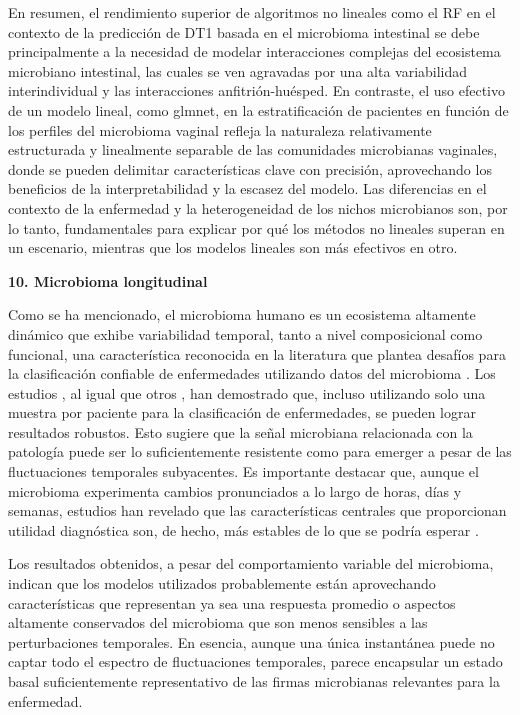 En resumen, el rendimiento superior de algoritmos no lineales como el RF en el contexto de la predicción de DT1 basada en el microbioma intestinal \cite{paper2} se debe principalmente a la necesidad de modelar interacciones complejas del ecosistema microbiano intestinal, las cuales se ven agravadas por una alta variabilidad interindividual y las interacciones anfitrión-huésped. En contraste, el uso efectivo de un modelo lineal, como glmnet, en la estratificación de pacientes en función de los perfiles del microbioma vaginal \cite{paper3} refleja la naturaleza relativamente estructurada y linealmente separable de las comunidades microbianas vaginales, donde se pueden delimitar características clave con precisión, aprovechando los beneficios de la interpretabilidad y la escasez del modelo. Las diferencias en el contexto de la enfermedad y la heterogeneidad de los nichos microbianos son, por lo tanto, fundamentales para explicar por qué los métodos no lineales superan en un escenario, mientras que los modelos lineales son más efectivos en otro.

\textbf{10. Microbioma longitudinal}

Como se ha mencionado, el microbioma humano es un ecosistema altamente dinámico que exhibe variabilidad temporal, tanto a nivel composicional como funcional, una característica reconocida en la literatura que plantea desafíos para la clasificación confiable de enfermedades utilizando datos del microbioma \cite{aldars2021systematic}. Los estudios \cite{paper2, paper3}, al igual que otros \cite{eck2017robust}, han demostrado que, incluso utilizando solo una muestra por paciente para la clasificación de enfermedades, se pueden lograr resultados robustos. Esto sugiere que la señal microbiana relacionada con la patología puede ser lo suficientemente resistente como para emerger a pesar de las fluctuaciones temporales subyacentes. Es importante destacar que, aunque el microbioma experimenta cambios pronunciados a lo largo de horas, días y semanas, estudios han revelado que las características centrales que proporcionan utilidad diagnóstica son, de hecho, más estables de lo que se podría esperar \cite{mehta2018stability}.

Los resultados obtenidos, a pesar del comportamiento variable del microbioma, indican que los modelos utilizados probablemente están aprovechando características que representan ya sea una respuesta promedio o aspectos altamente conservados del microbioma que son menos sensibles a las perturbaciones temporales. En esencia, aunque una única instantánea puede no captar todo el espectro de fluctuaciones temporales, parece encapsular un estado basal suficientemente representativo de las firmas microbianas relevantes para la enfermedad.

